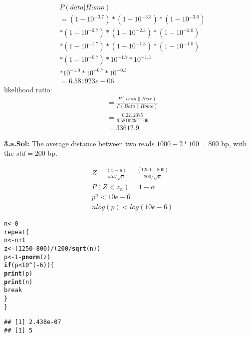 \documentclass[a4paper,11pt]{article}\usepackage{graphicx, color}
\makeatletter
\newcommand{\hlfunctioncall}[1]{\textcolor[rgb]{0.501960784313725,0,0.329411764705882}{\textbf{#1}}}%
\newenvironment{kframe}{%
 \def\at@end@of@kframe{}%
 \ifinner\ifhmode%
  \def\at@end@of@kframe{\end{minipage}}%
  \begin{minipage}{\columnwidth}%
 \fi\fi%
 \def\FrameCommand##1{\hskip\@totalleftmargin \hskip-\fboxsep
 \colorbox{shadecolor}{##1}\hskip-\fboxsep
     \hskip-\linewidth \hskip-\@totalleftmargin \hskip\columnwidth}%
 \MakeFramed {\advance\hsize-\width
   \@totalleftmargin\z@ \linewidth\hsize
   \@setminipage}}%
 {\par\unskip\endMakeFramed%
 \at@end@of@kframe}
\newenvironment{knitrout}{}{} %
\makeatother
\begin{document}
\begin{align}
	& P(data|Homo) \\
	&= (1-10^{-3.7})*(1-10^{-3.3})*(1-10^{-3.0}) \\
	& *(1-10^{-2.7})*(1-10^{-2.3})*(1-10^{-2.0}) \\
	& *(1-10^{-1.7})*(1-10^{-1.3})*(1-10^{-1.0}) \\ 
	& *(1-10^{-0.7})* 10^{-1.7} *10^{-1.3} \\
	& * 10^{-1.0} * 10^{-0.7} * 10^{-0.3} \\  
	&= 6.581923e-06
 
\end{align}
likelihood ratio: 
\begin{align}
	 	& = \frac{P(Data\|Hete)}{P(Data\|Homo)}  \\
 		& = \frac{0.2212375}{6.581923e-06} \\
 		& = 33612.9
\end{align}

\textbf{3.a.Sol:}
The average distance between two reads $1000-2 * 100 = 800$ bp, with the $std = 200$ bp. 

\begin{align}
& Z =\frac{(x-u)}{std/\sqrt{n}} = \frac{(1250-800)}{200/\sqrt{n}} \\
& P( Z < z_{\alpha}) = 1- \alpha\\
& p^{n} < 10e-6 \\
& nlog(p) < log(10e-6)
\end{align}
\begin{knitrout}
\color{fgcolor}\begin{kframe}
\begin{alltt}
n <- 0
repeat \{
    n <- n + 1
    z <- (1250 - 800)/(200/\hlfunctioncall{sqrt}(n))
    p <- 1 - \hlfunctioncall{pnorm}(z)
    \hlfunctioncall{if} (p < 10^(-6)) \{
        \hlfunctioncall{print}(p)
        \hlfunctioncall{print}(n)
        break
    \}
\}
\end{alltt}
\begin{verbatim}
## [1] 2.438e-07
## [1] 5
\end{verbatim}
\end{kframe}
\end{knitrout}
\end{document}
